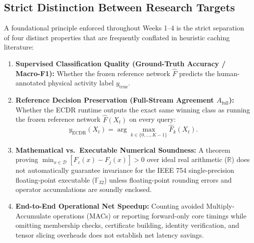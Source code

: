 \documentclass[11pt,a4paper]{article}
\newcommand{\R}{\mathbb{R}}
\newcommand{\F}{\mathbb{F}}
\newcommand{\Dset}{\mathcal{D}}
\theoremstyle{remark}
\begin{document}
\subsection{Strict Distinction Between Research Targets}
A foundational principle enforced throughout Weeks 1--4 is the strict separation of four distinct properties that are frequently conflated in heuristic caching literature:
\begin{enumerate}
  \item \textbf{Supervised Classification Quality (Ground-Truth Accuracy / Macro-F1):} Whether the frozen reference network $\widehat{F}$ predicts the human-annotated physical activity label $y_{\text{true}}$.
  \item \textbf{Reference Decision Preservation (Full-Stream Agreement $A_{\text{full}}$):} Whether the ECDR runtime outputs the exact same winning class as running the frozen reference network $\widehat{F}(X_t)$ on every query:
  \begin{equation}
    y_{\text{ECDR}}(X_t) = \arg\max_{k \in \{0,\dots,K-1\}} \widehat{F}_k(X_t).
  \end{equation}
  \item \textbf{Mathematical vs.\ Executable Numerical Soundness:} A theorem proving $\min_{x \in \Dset} [F_c(x) - F_j(x)] > 0$ over ideal real arithmetic ($\R$) does not automatically guarantee invariance for the IEEE 754 single-precision floating-point executable ($\F_{32}$) unless floating-point rounding errors and operator accumulations are soundly enclosed.
  \item \textbf{End-to-End Operational Net Speedup:} Counting avoided Multiply-Accumulate operations (MACs) or reporting forward-only core timings while omitting membership checks, certificate building, identity verification, and tensor slicing overheads does not establish net latency savings.
\end{enumerate}
\end{document}
